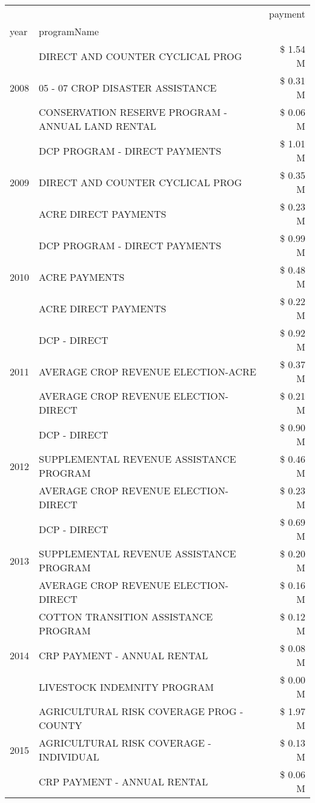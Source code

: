 \begin{tabular}{llr}
\toprule
 &  & payment \\
year & programName &  \\
\midrule
\multirow[t]{3}{*}{2008} & DIRECT AND COUNTER CYCLICAL PROG & \$ 1.54 M \\
 & 05 - 07 CROP DISASTER ASSISTANCE & \$ 0.31 M \\
 & CONSERVATION RESERVE PROGRAM - ANNUAL LAND RENTAL & \$ 0.06 M \\
\cline{1-3}
\multirow[t]{3}{*}{2009} & DCP PROGRAM - DIRECT PAYMENTS & \$ 1.01 M \\
 & DIRECT AND COUNTER CYCLICAL PROG & \$ 0.35 M \\
 & ACRE DIRECT PAYMENTS & \$ 0.23 M \\
\cline{1-3}
\multirow[t]{3}{*}{2010} & DCP PROGRAM - DIRECT PAYMENTS & \$ 0.99 M \\
 & ACRE PAYMENTS & \$ 0.48 M \\
 & ACRE DIRECT PAYMENTS & \$ 0.22 M \\
\cline{1-3}
\multirow[t]{3}{*}{2011} & DCP - DIRECT & \$ 0.92 M \\
 & AVERAGE CROP REVENUE ELECTION-ACRE & \$ 0.37 M \\
 & AVERAGE CROP REVENUE ELECTION-DIRECT & \$ 0.21 M \\
\cline{1-3}
\multirow[t]{3}{*}{2012} & DCP - DIRECT & \$ 0.90 M \\
 & SUPPLEMENTAL REVENUE ASSISTANCE PROGRAM & \$ 0.46 M \\
 & AVERAGE CROP REVENUE ELECTION-DIRECT & \$ 0.23 M \\
\cline{1-3}
\multirow[t]{3}{*}{2013} & DCP - DIRECT & \$ 0.69 M \\
 & SUPPLEMENTAL REVENUE ASSISTANCE PROGRAM & \$ 0.20 M \\
 & AVERAGE CROP REVENUE ELECTION-DIRECT & \$ 0.16 M \\
\cline{1-3}
\multirow[t]{3}{*}{2014} & COTTON TRANSITION ASSISTANCE PROGRAM & \$ 0.12 M \\
 & CRP PAYMENT - ANNUAL RENTAL & \$ 0.08 M \\
 & LIVESTOCK INDEMNITY PROGRAM & \$ 0.00 M \\
\cline{1-3}
\multirow[t]{3}{*}{2015} & AGRICULTURAL RISK COVERAGE PROG - COUNTY & \$ 1.97 M \\
 & AGRICULTURAL RISK COVERAGE - INDIVIDUAL & \$ 0.13 M \\
 & CRP PAYMENT - ANNUAL RENTAL & \$ 0.06 M \\

\end{tabular}
